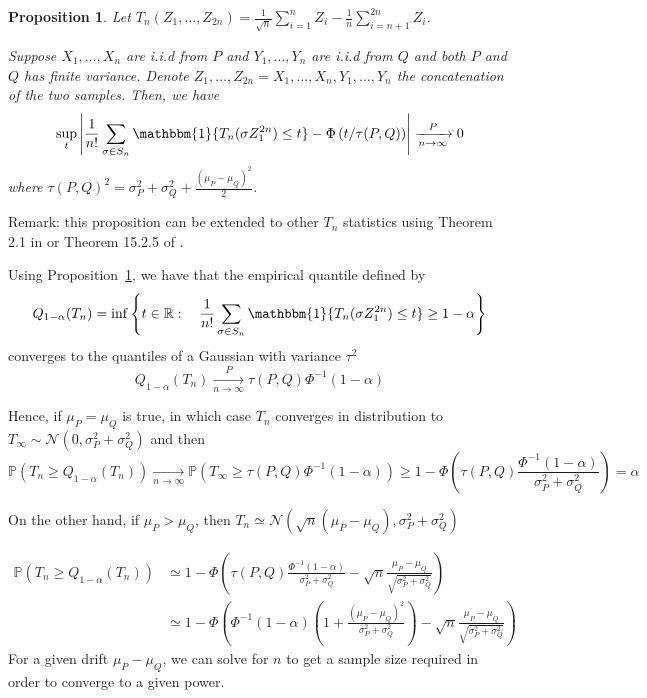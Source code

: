 \documentclass{article}
\theoremstyle{plain}
\newtheorem{Proposition}{Proposition}
\theoremstyle{remark}
\renewcommand{\P}{\mathbb{P}}
\newcommand{\R}{\mathbb{R}}
\newcommand{\1}{\mathbbm{1}}
\newcommand{\todoT}[1]{\todo[inline,color=blue!40]{{\textbf{T:}~}#1}}
\numberwithin{equation}{section}
\begin{document}
\begin{Proposition}\label{prop:asym_perm_test}
Let $T_n(Z_1,\dots,Z_{2n})=\frac{1}{\sqrt{n}}\sum_{i=1}^n Z_i -\frac{1}{n}\sum_{i=n+1}^{2n} Z_i$.

Suppose $X_1,\dots,X_n$ are i.i.d from $P$ and $Y_1,\dots,Y_n$ are i.i.d from $Q$ and both $P$ and $Q$ has finite variance. Denote $Z_1,\dots,Z_{2n}=X_1,\dots,X_n, Y_1,\dots,Y_n$ the concatenation of the two samples. Then, we have
$$\sup_{t}\left|\frac{1}{n!}\sum_{\sigma \in S_n} \1\{T_n(\sigma Z_{1}^{2n}) \le t\}- \Phi\left(t/\tau(P,Q) \right)\right|\xrightarrow[n \to \infty]{P} 0$$
where $\tau(P,Q)^2=\sigma_P^2+\sigma_Q^2+\frac{(\mu_P- \mu_Q)^2}{2} $.
\end{Proposition}
Remark: this proposition can be extended to other $T_n$ statistics using Theorem 2.1 in \cite{Chung_2013} or Theorem 15.2.5 of \cite{lehmann2005testing}.

Using Proposition~\ref{prop:asym_perm_test}, we have that the empirical quantile defined by
$$Q_{1-\alpha}(T_n) = \inf\left\{t \in \R:\quad \frac{1}{n!}\sum_{\sigma \in S_n} \1\{T_n(\sigma Z_{1}^{2n}) \le t\} \ge 1-\alpha\right\} $$
converges to the quantiles of a Gaussian with variance $\tau^2$
$$Q_{1-\alpha}(T_n)\xrightarrow[n \to \infty]{P} \tau(P,Q)\Phi^{-1}(1-\alpha) $$

 Hence, if $\mu_P = \mu_Q$ is true, in which case $T_n$ converges in distribution to $T_\infty\sim \mathcal{N}(0,\sigma_P^2+\sigma_Q^2 )$ and then
$$\P\left( T_n \ge Q_{1-\alpha}(T_n)\right) \xrightarrow[n \to \infty]{} \P(T_\infty\ge \tau(P,Q)\Phi^{-1}(1-\alpha)) \ge  1-\Phi\left(\tau(P,Q)\frac{\Phi^{-1}(1-\alpha)}{\sigma_P^2+\sigma_Q^2 } \right)=\alpha  $$

On the other hand, if $\mu_P > \mu_Q$, then $T_n \simeq \mathcal{N}(\sqrt{n}(\mu_P-\mu_Q),\sigma_P^2+\sigma_Q^2 ) $

\begin{align*}
\P\left( T_n \ge Q_{1-\alpha}(T_n)\right)&\simeq  1-\Phi\left(\tau(P,Q)\frac{\Phi^{-1}(1-\alpha)}{\sigma_P^2+\sigma_Q^2 }-  \sqrt{n}\frac{\mu_P-\mu_Q}{\sqrt{\sigma_P^2+\sigma_Q^2}} \right)  \\
&\simeq  1-\Phi\left(\Phi^{-1}(1-\alpha)\left(1+\frac{(\mu_P-\mu_Q)^2}{\sigma_P^2+\sigma_Q^2 }\right)-  \sqrt{n}\frac{\mu_P-\mu_Q}{\sqrt{\sigma_P^2+\sigma_Q^2}} \right)
\end{align*}
For a given drift $\mu_P-\mu_Q$, we can solve for $n$ to get a sample size required in order to converge to a given power.
\end{document}
